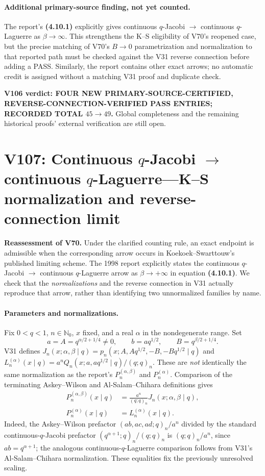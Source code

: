\documentclass[11pt]{article}
\begin{document}
\paragraph{Additional primary-source finding, not yet counted.}
The report's \textbf{(4.10.1)} explicitly gives continuous $q$-Jacobi $\to$ continuous $q$-Laguerre as $\beta\to\infty$. This strengthens the K--S eligibility of V70's reopened case, but the precise matching of V70's $B\to0$ parametrization and normalization to that reported path must be checked against the V31 reverse connection before adding a PASS. Similarly, the report contains other exact arrows; no automatic credit is assigned without a matching V31 proof and duplicate check.

\noindent\textbf{V106 verdict: FOUR NEW PRIMARY-SOURCE-CERTIFIED, REVERSE-CONNECTION-VERIFIED PASS ENTRIES; RECORDED TOTAL $45\to49$.} Global completeness and the remaining historical proofs' external verification are still open.


\clearpage
\section{V107: Continuous $q$-Jacobi $\to$ continuous $q$-Laguerre---K--S normalization and reverse-connection limit}
\noindent\textbf{Reassessment of V70.} Under the clarified counting rule, an exact endpoint is admissible when the corresponding arrow occurs in Koekoek--Swarttouw's published limiting scheme. The 1998 report explicitly states the continuous $q$-Jacobi $\to$ continuous $q$-Laguerre arrow as $\beta\to+\infty$ in equation \textbf{(4.10.1)}. We check that the \emph{normalizations} and the reverse connection in V31 actually reproduce that arrow, rather than identifying two unnormalized families by name.

\paragraph{Parameters and normalizations.}
Fix $0<q<1$, $n\in\mathbb N_0$, $x$ fixed, and a real $\alpha$ in the nondegenerate range. Set
\[
 a=A=q^{\alpha/2+1/4}\ne0,\qquad b=aq^{1/2},\qquad B=q^{\beta/2+1/4}.
\]
V31 defines $J_n(x;\alpha,\beta\mid q)=p_n(x;A,Aq^{1/2},-B,-Bq^{1/2}\mid q)$ and $L_n^{(\alpha)}(x\mid q)=a^n Q_n(x;a,aq^{1/2}\mid q)/(q;q)_n$. These are \emph{not} identically the same normalization as the report's $P_n^{(\alpha,\beta)}$ and $P_n^{(\alpha)}$. Comparison of the terminating Askey--Wilson and Al-Salam--Chihara definitions gives
\begin{align}
 P_n^{(\alpha,\beta)}(x\mid q)&=\frac{a^n}{(q;q)_n}J_n(x;\alpha,\beta\mid q),\label{eq:v107-jnorm}\\
 P_n^{(\alpha)}(x\mid q)&=L_n^{(\alpha)}(x\mid q).\label{eq:v107-lnorm}
\end{align}
Indeed, the Askey--Wilson prefactor $(ab,ac,ad;q)_n/a^n$ divided by the standard continuous-$q$-Jacobi prefactor $(q^{\alpha+1};q)_n/(q;q)_n$ is $(q;q)_n/a^n$, since $ab=q^{\alpha+1}$; the analogous continuous-$q$-Laguerre comparison follows from V31's Al-Salam--Chihara normalization. These equalities fix the previously unresolved scaling.
\end{document}
